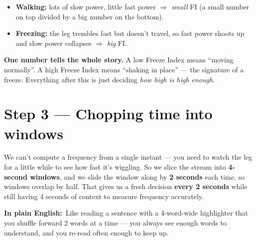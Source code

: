 \documentclass[11pt]{article}
\newcommand{\pe}{\textbf{\color{teal}In plain English:}\ }
\begin{document}
\begin{itemize}
  \item \textbf{Walking:} lots of slow power, little fast power
        $\Rightarrow$ \emph{small} FI (a small number on top divided by a big
        number on the bottom).
  \item \textbf{Freezing:} the leg trembles fast but doesn't travel, so fast
        power shoots up and slow power collapses $\Rightarrow$ \emph{big} FI.
\end{itemize}

\begin{keyidea}
\textbf{One number tells the whole story.} A low Freeze Index means ``moving
normally''. A high Freeze Index means ``shaking in place'' --- the signature of a
freeze. Everything after this is just deciding \emph{how high is high enough}.
\end{keyidea}

\section{Step 3 --- Chopping time into windows}

We can't compute a frequency from a single instant --- you need to watch the leg
for a little while to see how fast it's wiggling. So we slice the stream into
\textbf{4-second windows}, and we slide the window along by \textbf{2 seconds}
each time, so windows overlap by half. That gives us a fresh decision
\textbf{every 2 seconds} while still having 4 seconds of context to measure
frequency accurately.

\pe Like reading a sentence with a 4-word-wide highlighter that you shuffle
forward 2 words at a time --- you always see enough words to understand, and you
re-read often enough to keep up.
\end{document}

